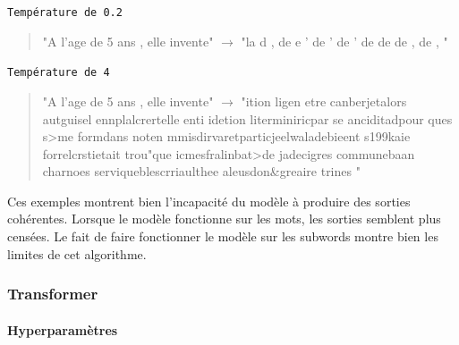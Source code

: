 \noindent{} \texttt{Température de 0.2}

  \begin{quotation}
    
    "A l'age de 5 ans , elle invente" $\rightarrow$ "la d  \hspace{0.3cm},  \hspace{0.3cm}  de   \hspace{0.3cm}  e  \hspace{3cm}                ' de   \hspace{0.6cm}  ' de \hspace{2.7cm}              ' de    \hspace{2cm}     de  \hspace{0.6cm}   de \hspace{0.6cm}   ,  \hspace{0.5cm}         de \hspace{0.3cm}     , \hspace{0.8cm}             "
  \end{quotation}



\noindent{} \texttt{Température de 4}


  \begin{quotation}
  "A l'age de 5 ans , elle invente" $\rightarrow$ "ition ligen etre canberjetalors autguisel ennplalcrertelle enti idetion literminiricpar se anciditadpour ques s>me formdans noten mmisdirvaretparticjeelwaladebieent s199kaie forrelcrstietait trou"que icmesfralinbat>de jadecigres communebaan charnoes serviqueblescrriaulthee aleusdon\&greaire trines "
  \end{quotation}



Ces exemples montrent bien l'incapacité du modèle à produire des sorties
cohérentes. Lorsque le modèle fonctionne sur les mots, les sorties
semblent plus censées. Le fait de faire fonctionner le modèle sur les
subwords montre bien les limites de cet algorithme.

\hypertarget{transformer}{%
\subsubsection{Transformer}\label{transformer}}

\paragraph{Hyperparamètres}

